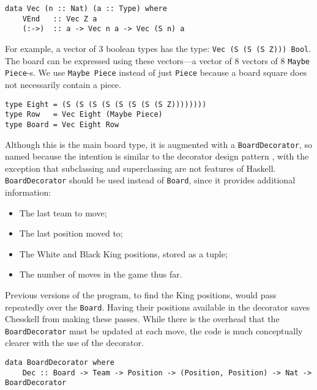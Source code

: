 \documentclass[12pt, a4paper, bibliography=totocnumbered]{scrartcl}
\begin{document}
\begin{lstlisting}
data Vec (n :: Nat) (a :: Type) where
    VEnd   :: Vec Z a
    (:->)  :: a -> Vec n a -> Vec (S n) a
\end{lstlisting}

For example, a vector of 3 boolean types has the type: \lstinline[basicstyle=\ttfamily]{Vec (S (S (S Z))) Bool}. The board can be expressed using these vectors---a vector of 8 vectors of 8 \lstinline[basicstyle=\ttfamily]{Maybe Piece}-s. We use \lstinline[basicstyle=\ttfamily]{Maybe Piece} instead of just \lstinline[basicstyle=\ttfamily]{Piece} because a board square does not necessarily contain a piece.

\begin{lstlisting}
type Eight = (S (S (S (S (S (S (S (S Z))))))))
type Row   = Vec Eight (Maybe Piece)
type Board = Vec Eight Row
\end{lstlisting}

Although this is the main board type, it is augmented with a \lstinline[basicstyle=\ttfamily]{BoardDecorator}, so named because the intention is similar to the decorator design pattern \cite{decorator}, with the exception that subclassing and superclassing are not features of Haskell. \lstinline[basicstyle=\ttfamily]{BoardDecorator} should be used instead of \lstinline[basicstyle=\ttfamily]{Board}, since it provides additional information:

\begin{itemize}
    \item The last team to move;
    \item The last position moved to;
    \item The White and Black King positions, stored as a tuple;
    \item The number of moves in the game thus far.
\end{itemize}

Previous versions of the program, to find the King positions, would pass repeatedly over the \lstinline[basicstyle=\ttfamily]{Board}. Having their positions available in the decorator saves Chesskell from making these passes. While there is the overhead that the \lstinline[basicstyle=\ttfamily]{BoardDecorator} must be updated at each move, the code is much conceptually clearer with the use of the decorator.

\begin{lstlisting}
data BoardDecorator where
    Dec :: Board -> Team -> Position -> (Position, Position) -> Nat -> BoardDecorator
\end{lstlisting}
\end{document}

